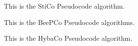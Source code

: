 









This is the StiCo Pseudocode algorithm\cite{Ranjbar-Sahraei2012Demo}.

This is the BeePCo Pseudocode algorithms\cite{Caliskanelli2015}.

This is the HybaCo Pseudocode algorithm\cite{Broecker2015Demo}.








